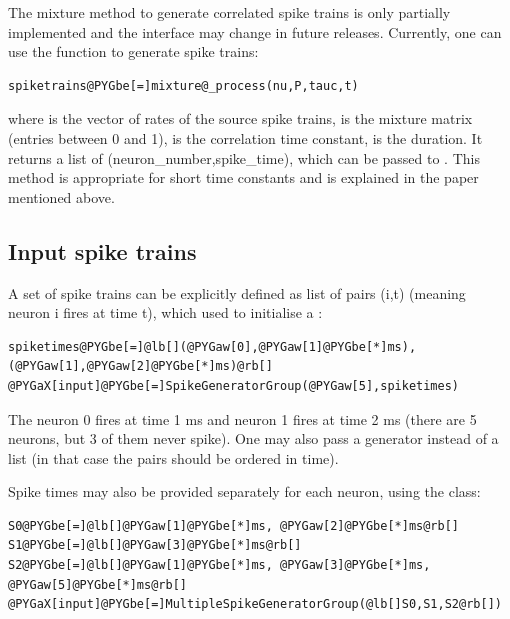\documentclass[letterpaper,10pt,english]{manual}
\begin{document}
The mixture method to generate correlated spike trains is only partially implemented and the
interface may change in future releases. Currently, one can use the function
 to generate spike trains:

\begin{Verbatim}[commandchars=@\[\]]
spiketrains@PYGbe[=]mixture@_process(nu,P,tauc,t)
\end{Verbatim}

where  is the vector of rates of the source spike trains,
 is the mixture matrix (entries between 0 and 1),
 is the correlation time constant,
 is the duration. It returns a list of
(neuron\_number,spike\_time), which can be passed to
. This method is appropriate for short time constants and is explained
in the paper mentioned above.


\subsection{Input spike trains}

A set of spike trains can be explicitly defined as list of pairs (i,t)
(meaning neuron i fires at time t), which used to initialise a
\hyperlink{brian.SpikeGeneratorGroup}{}:

\begin{Verbatim}[commandchars=@\[\]]
spiketimes@PYGbe[=]@lb[](@PYGaw[0],@PYGaw[1]@PYGbe[*]ms), (@PYGaw[1],@PYGaw[2]@PYGbe[*]ms)@rb[]
@PYGaX[input]@PYGbe[=]SpikeGeneratorGroup(@PYGaw[5],spiketimes)
\end{Verbatim}

The neuron 0 fires at time 1 ms and neuron 1 fires at time 2 ms (there are 5 neurons,
but 3 of them never spike).
One may also pass a generator instead of a list (in that case the pairs should be
ordered in time).

Spike times may also be provided separately for each neuron, using the
\hyperlink{brian.MultipleSpikeGeneratorGroup}{} class:

\begin{Verbatim}[commandchars=@\[\]]
S0@PYGbe[=]@lb[]@PYGaw[1]@PYGbe[*]ms, @PYGaw[2]@PYGbe[*]ms@rb[]
S1@PYGbe[=]@lb[]@PYGaw[3]@PYGbe[*]ms@rb[]
S2@PYGbe[=]@lb[]@PYGaw[1]@PYGbe[*]ms, @PYGaw[3]@PYGbe[*]ms, @PYGaw[5]@PYGbe[*]ms@rb[]
@PYGaX[input]@PYGbe[=]MultipleSpikeGeneratorGroup(@lb[]S0,S1,S2@rb[])
\end{Verbatim}
\end{document}
